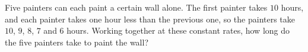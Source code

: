 Five painters can each paint a certain wall alone. The first painter takes $10$ hours, and each painter takes one hour less than the previous one, so the painters take $10$, $9$, $8$, $7$ and $6$ hours. Working together at these constant rates, how long do the five painters take to paint the wall?
